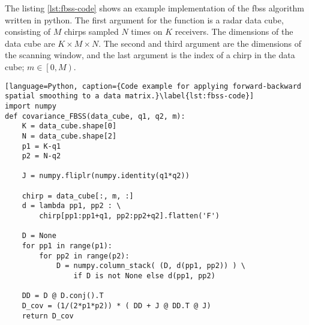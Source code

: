 The listing \ref{lst:fbss-code} shows an example implementation of the \gls{fbss} algorithm written in python.
The first argument for the function is a radar data cube, consisting of $M$ chirps sampled $N$ times on $K$ receivers.
The dimensions of the data cube are $K \times M \times N$.
The second and third argument are the dimensions of the scanning window,
and the last argument is the index of a chirp in the data cube; $m \in \left[ 0, M \right)$.

\begin{lstlisting}[language=Python, caption={Code example for applying forward-backward spatial smoothing to a data matrix.}\label{lst:fbss-code}]
import numpy
def covariance_FBSS(data_cube, q1, q2, m):
    K = data_cube.shape[0]
    N = data_cube.shape[2]
    p1 = K-q1
    p2 = N-q2

    J = numpy.fliplr(numpy.identity(q1*q2))
    
    chirp = data_cube[:, m, :]
    d = lambda pp1, pp2 : \
        chirp[pp1:pp1+q1, pp2:pp2+q2].flatten('F')
        
    D = None
    for pp1 in range(p1):
        for pp2 in range(p2):
            D = numpy.column_stack( (D, d(pp1, pp2)) ) \
                if D is not None else d(pp1, pp2)

    DD = D @ D.conj().T
    D_cov = (1/(2*p1*p2)) * ( DD + J @ DD.T @ J)
    return D_cov
\end{lstlisting}